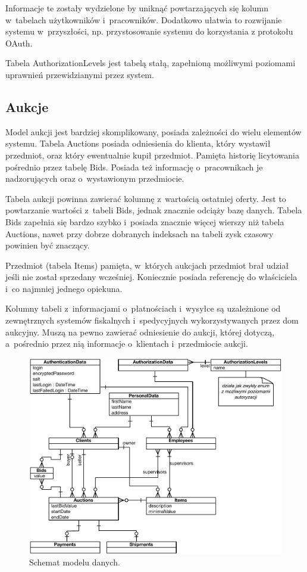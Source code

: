 \documentclass[10pt,a4paper]{article}
\newcommand{\s}[1]{\textsf{#1}}
\begin{document}
Informacje te zostały wydzielone by uniknąć powtarzających się kolumn
w~tabelach użytkowników i~pracowników. Dodatkowo ułatwia to rozwijanie systemu
w~przyszłości, np. przystosowanie systemu do korzystania z protokołu OAuth.

Tabela \s{AuthorizationLevels} jest tabelą stałą, zapełnioną możliwymi
poziomami uprawnień przewidzianymi przez system.

\subsection{Aukcje}

Model aukcji jest bardziej skomplikowany, posiada zależności do wielu elementów
systemu. Tabela \s{Auctions} posiada odniesienia do klienta, który wystawił
przedmiot, oraz który ewentualnie kupił przedmiot. Pamięta historię licytowania
pośrednio przez tabelę \s{Bids}. Posiada też informację o~pracownikach je
nadzorujących oraz o~wystawionym przedmiocie.

Tabela aukcji powinna zawierać kolumnę z~wartością ostatniej oferty. Jest to
powtarzanie wartości z~tabeli \s{Bids}, jednak znacznie odciąży bazę danych.
Tabela \s{Bids} zapełnia się bardzo szybko i~posiada znacznie więcej wierszy
niż tabela \s{Auctions}, nawet przy dobrze dobranych indeksach na tabeli zysk
czasowy powinien być znaczący.

Przedmiot (tabela \s{Items}) pamięta, w~których aukcjach przedmiot brał udział
jeśli nie został sprzedany wcześniej. Koniecznie posiada referencję do
właściciela i~co najmniej jednego opiekuna.

Kolumny tabeli z~informacjami o~płatnościach i~wysyłce są uzależnione od
zewnętrznych systemów fiskalnych i~spedycyjnych wykorzystywanych przez dom
aukcyjny. Muszą na pewno zawierać odniesienie do aukcji, której dotyczą,
a~pośrednio przez nią informacje o~klientach i~przedmiocie aukcji.

\begin{figure}[p]
  \begin{adjustwidth}{-2cm}{-2cm}
    \centering
    \includegraphics{figury/model-danych}
    \caption{Schemat modelu danych.}
    \label{fig:model_danych}
  \end{adjustwidth}
\end{figure}
\end{document}
